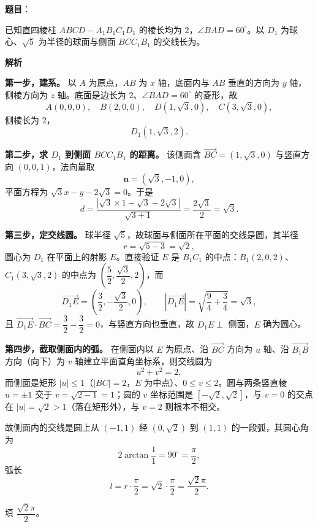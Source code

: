 \begin{answer}

\textbf{题目}：

已知直四棱柱 $ABCD-A_1B_1C_1D_1$ 的棱长均为 $2$，$\angle BAD=60^\circ$。以 $D_1$ 为球心、$\sqrt5$ 为半径的球面与侧面 $BCC_1B_1$ 的交线长为\gkblank{}。

\textbf{解析}

\textbf{第一步，建系。} 以 $A$ 为原点，$AB$ 为 $x$ 轴，底面内与 $AB$ 垂直的方向为 $y$ 轴，侧棱方向为 $z$ 轴。底面是边长为 $2$、$\angle BAD=60^\circ$ 的菱形，故
\nopagebreak[4]
\[A(0,0,0),\quad B(2,0,0),\quad D(1,\sqrt3,0),\quad C(3,\sqrt3,0),\]
侧棱长为 $2$，
\nopagebreak[4]
\[D_1(1,\sqrt3,2).\]

\textbf{第二步，求 $D_1$ 到侧面 $BCC_1B_1$ 的距离。} 该侧面含 $\overrightarrow{BC}=(1,\sqrt3,0)$ 与竖直方向 $(0,0,1)$，法向量取
\nopagebreak[4]
\[\boldsymbol n=(\sqrt3,-1,0),\]
平面方程为 $\sqrt3x-y-2\sqrt3=0$。于是
\nopagebreak[4]
\[d=\frac{|\sqrt3\times1-\sqrt3-2\sqrt3|}{\sqrt{3+1}}=\frac{2\sqrt3}2=\sqrt3 .\]

\textbf{第三步，定交线圆。} 球半径 $\sqrt5$，故球面与侧面所在平面的交线是圆，其半径
\nopagebreak[4]
\[r=\sqrt{5-3}=\sqrt2,\]
圆心为 $D_1$ 在平面上的射影 $E$。直接验证 $E$ 是 $B_1C_1$ 的中点：$B_1(2,0,2)$、$C_1(3,\sqrt3,2)$ 的中点为 $\left(\dfrac52,\dfrac{\sqrt3}2,2\right)$，而
\nopagebreak[4]
\[\overrightarrow{D_1E}=\left(\frac32,-\frac{\sqrt3}2,0\right),\qquad |\overrightarrow{D_1E}|=\sqrt{\frac94+\frac34}=\sqrt3,\]
且 $\overrightarrow{D_1E}\cdot\overrightarrow{BC}=\dfrac32-\dfrac32=0$，与竖直方向也垂直，故 $D_1E\perp$ 侧面，$E$ 确为圆心。

\textbf{第四步，截取侧面内的弧。} 在侧面内以 $E$ 为原点、沿 $\overrightarrow{BC}$ 方向为 $u$ 轴、沿 $\overrightarrow{B_1B}$ 方向（向下）为 $v$ 轴建立平面直角坐标系，则交线圆为
\nopagebreak[4]
\[u^2+v^2=2,\]
而侧面是矩形 $|u|\leqslant1$（$|BC|=2$，$E$ 为中点）、$0\leqslant v\leqslant2$。圆与两条竖直棱 $u=\pm1$ 交于 $v=\sqrt{2-1}=1$；圆的 $v$ 坐标范围是 $\left[-\sqrt2,\sqrt2\right]$，与 $v=0$ 的交点在 $|u|=\sqrt2>1$（落在矩形外），与 $v=2$ 则根本不相交。

故侧面内的交线是圆上从 $\left(-1,1\right)$ 经 $\left(0,\sqrt2\right)$ 到 $\left(1,1\right)$ 的一段弧，其圆心角为
\nopagebreak[4]
\[2\arctan\frac{1}{1}=90^\circ=\frac\pi2,\]
弧长
\nopagebreak[4]
\[l=r\cdot\frac\pi2=\sqrt2\cdot\frac\pi2=\frac{\sqrt2\pi}2 .\]

填 $\dfrac{\sqrt2\pi}2$。


\end{answer}
